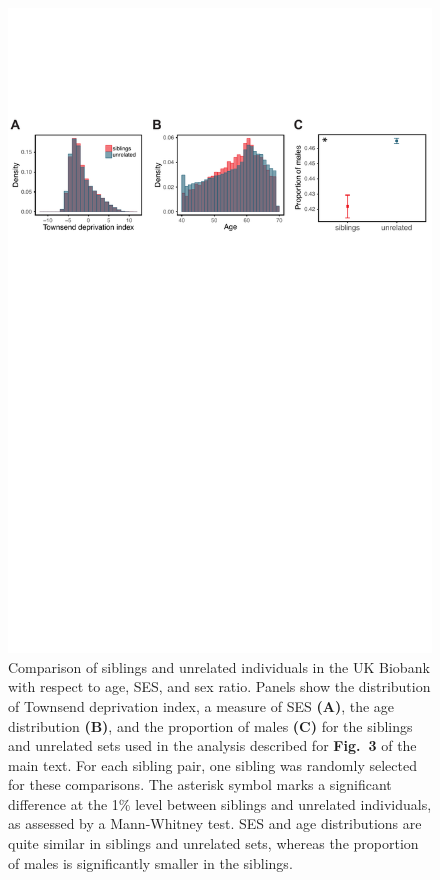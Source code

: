 \documentclass[hidelinks, 12pt]{article}
\begin{document}
\pagebreak

\begin{figure}[h]
\centering
\includegraphics[width=\textwidth]{./supp_figures/sibs_unrel_compare1.pdf}
\caption[Comparison of siblings and unrelated individuals in the UK Biobank with respect to age, SES, and sex ratio]{\small Comparison of siblings and unrelated individuals in the UK Biobank with respect to age, SES, and sex ratio. Panels show the distribution of Townsend deprivation index, a measure of SES {\bf (A)}, the age distribution {\bf (B)}, and the proportion of males {\bf (C)} for the siblings and unrelated sets used in the analysis described for {\bf Fig.~3} of the main text. For each sibling pair, one sibling was randomly selected for these comparisons. The asterisk symbol marks a significant difference at the 1\% level between siblings and unrelated individuals, as assessed by a Mann-Whitney test. SES and age distributions are quite similar in siblings and unrelated sets, whereas the proportion of males is significantly smaller in the siblings.}
\end{figure}
\end{document}
